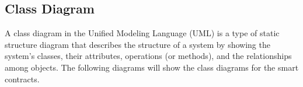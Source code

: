 
\subsection{Class Diagram}

A class diagram in the Unified Modeling Language (UML) is a type of static structure diagram that describes the structure of a system by showing the system's classes, their attributes, operations (or methods), and the relationships among objects.
The following diagrams will show the class diagrams for the smart contracts.

